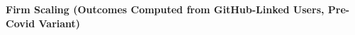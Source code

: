 \documentclass{article}
\begin{document}
\thispagestyle{empty}

\begin{table}[h!]
\caption{\textbf{Firm Scaling (Outcomes Computed from GitHub-Linked Users, Pre-Covid Variant)}}

\end{table}
\end{document}
